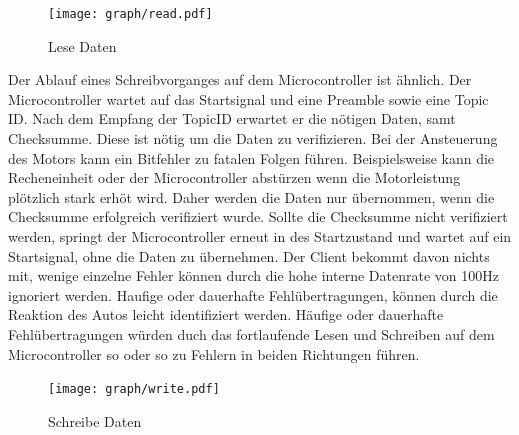 \begin{figure}[ht]
\centering
\texttt{[image: graph/read.pdf]} 
\caption{Lese Daten}
\label{fig:uC_read}
\end{figure}

Der Ablauf eines Schreibvorganges auf dem Microcontroller ist ähnlich. Der Microcontroller wartet auf das Startsignal und eine Preamble sowie eine Topic ID.
Nach dem Empfang der TopicID erwartet er die nötigen Daten, samt Checksumme. Diese ist nötig um die Daten zu verifizieren. Bei der Ansteuerung des Motors kann ein
Bitfehler zu fatalen Folgen führen. Beispielsweise kann die Recheneinheit oder der Microcontroller abstürzen wenn die Motorleistung plötzlich stark erhöt wird.
Daher werden die Daten nur übernommen, wenn die Checksumme erfolgreich verifiziert wurde. Sollte die Checksumme nicht verifiziert werden, springt der Microcontroller
erneut in des Startzustand und wartet auf ein Startsignal, ohne die Daten zu übernehmen. Der Client bekommt davon nichts mit, wenige einzelne Fehler können durch die
hohe interne Datenrate von 100Hz ignoriert werden. Haufige oder dauerhafte Fehlübertragungen, können durch die Reaktion des Autos leicht identifiziert werden.
Häufige oder dauerhafte Fehlübertragungen würden duch das fortlaufende Lesen und Schreiben auf dem Microcontroller so oder so zu Fehlern in beiden Richtungen führen.

\begin{figure}[ht]
\centering
\texttt{[image: graph/write.pdf]} 
\caption{Schreibe Daten}
\label{fig:uC_write}
\end{figure}





